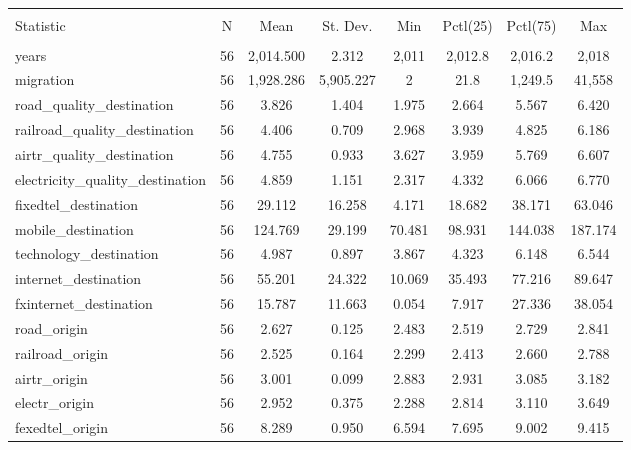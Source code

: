 \begin{table}[!htbp] \centering 
  \caption{} 
  \label{} 
\begin{tabular}{@{\extracolsep{5pt}}lccccccc} 
\\[-1.8ex]\hline 
\hline \\[-1.8ex] 
Statistic & \multicolumn{1}{c}{N} & \multicolumn{1}{c}{Mean} & \multicolumn{1}{c}{St. Dev.} & \multicolumn{1}{c}{Min} & \multicolumn{1}{c}{Pctl(25)} & \multicolumn{1}{c}{Pctl(75)} & \multicolumn{1}{c}{Max} \\ 
\hline \\[-1.8ex] 
years & 56 & 2,014.500 & 2.312 & 2,011 & 2,012.8 & 2,016.2 & 2,018 \\ 
migration & 56 & 1,928.286 & 5,905.227 & 2 & 21.8 & 1,249.5 & 41,558 \\ 
road\_quality\_destination & 56 & 3.826 & 1.404 & 1.975 & 2.664 & 5.567 & 6.420 \\ 
railroad\_quality\_destination & 56 & 4.406 & 0.709 & 2.968 & 3.939 & 4.825 & 6.186 \\ 
airtr\_quality\_destination & 56 & 4.755 & 0.933 & 3.627 & 3.959 & 5.769 & 6.607 \\ 
electricity\_quality\_destination & 56 & 4.859 & 1.151 & 2.317 & 4.332 & 6.066 & 6.770 \\ 
fixedtel\_destination & 56 & 29.112 & 16.258 & 4.171 & 18.682 & 38.171 & 63.046 \\ 
mobile\_destination & 56 & 124.769 & 29.199 & 70.481 & 98.931 & 144.038 & 187.174 \\ 
technology\_destination & 56 & 4.987 & 0.897 & 3.867 & 4.323 & 6.148 & 6.544 \\ 
internet\_destination & 56 & 55.201 & 24.322 & 10.069 & 35.493 & 77.216 & 89.647 \\ 
fxinternet\_destination & 56 & 15.787 & 11.663 & 0.054 & 7.917 & 27.336 & 38.054 \\ 
road\_origin & 56 & 2.627 & 0.125 & 2.483 & 2.519 & 2.729 & 2.841 \\ 
railroad\_origin & 56 & 2.525 & 0.164 & 2.299 & 2.413 & 2.660 & 2.788 \\ 
airtr\_origin & 56 & 3.001 & 0.099 & 2.883 & 2.931 & 3.085 & 3.182 \\ 
electr\_origin & 56 & 2.952 & 0.375 & 2.288 & 2.814 & 3.110 & 3.649 \\ 
fexedtel\_origin & 56 & 8.289 & 0.950 & 6.594 & 7.695 & 9.002 & 9.415 \\ 

\end{tabular}
\end{table}
